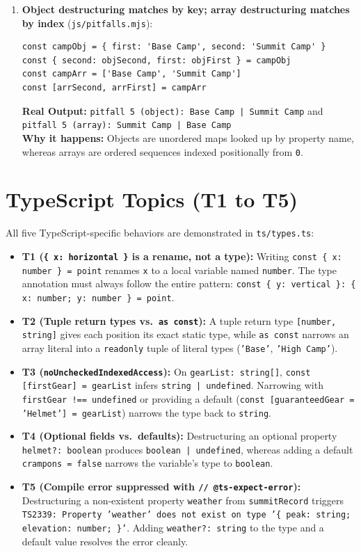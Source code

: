 \documentclass[11pt, a4paper]{article}
\begin{document}
\begin{enumerate}
  \item \textbf{Object destructuring matches by key; array destructuring matches by index} (\texttt{js/pitfalls.mjs}):
\begin{lstlisting}
const campObj = { first: 'Base Camp', second: 'Summit Camp' }
const { second: objSecond, first: objFirst } = campObj
const campArr = ['Base Camp', 'Summit Camp']
const [arrSecond, arrFirst] = campArr
\end{lstlisting}
  \textbf{Real Output:} \texttt{pitfall 5 (object): Base Camp | Summit Camp} and \texttt{pitfall 5 (array): Summit Camp | Base Camp}\\
  \textbf{Why it happens:} Objects are unordered maps looked up by property name, whereas arrays are ordered sequences indexed positionally from \texttt{0}.
\end{enumerate}

\section{TypeScript Topics (T1 to T5)}

All five TypeScript-specific behaviors are demonstrated in \texttt{ts/types.ts}:

\begin{itemize}
  \item \textbf{T1 (\texttt{\{ x: horizontal \}} is a rename, not a type):} Writing \texttt{const \{ x: number \} = point} renames \texttt{x} to a local variable named \texttt{number}. The type annotation must always follow the entire pattern: \texttt{const \{ y: vertical \}: \{ x: number; y: number \} = point}.
  \item \textbf{T2 (Tuple return types vs.\ \texttt{as const}):} A tuple return type \texttt{[number, string]} gives each position its exact static type, while \texttt{as const} narrows an array literal into a \texttt{readonly} tuple of literal types (\texttt{'Base'}, \texttt{'High Camp'}).
  \item \textbf{T3 (\texttt{noUncheckedIndexedAccess}):} On \texttt{gearList: string[]}, \texttt{const [firstGear] = gearList} infers \texttt{string | undefined}. Narrowing with \texttt{firstGear !== undefined} or providing a default (\texttt{const [guaranteedGear = 'Helmet'] = gearList}) narrows the type back to \texttt{string}.
  \item \textbf{T4 (Optional fields vs.\ defaults):} Destructuring an optional property \texttt{helmet?: boolean} produces \texttt{boolean | undefined}, whereas adding a default \texttt{crampons = false} narrows the variable's type to \texttt{boolean}.
  \item \textbf{T5 (Compile error suppressed with \texttt{// @ts-expect-error}):} Destructuring a non-existent property \texttt{weather} from \texttt{summitRecord} triggers \texttt{TS2339: Property 'weather' does not exist on type '\{ peak: string; elevation: number; \}'}. Adding \texttt{weather?: string} to the type and a default value resolves the error cleanly.
\end{itemize}
\end{document}
